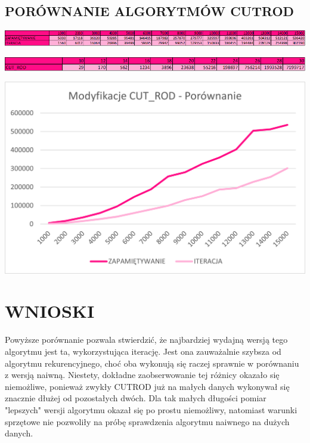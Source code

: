 \documentclass{article}
\begin{document}
\subsection*{PORÓWNANIE ALGORYTMÓW CUTROD}
\begin{center}
	\includegraphics[width = \textwidth]{Obraz8.png}
\end{center}
\begin{center}
	\includegraphics[width = \textwidth]{Obraz7.png}
\end{center}
\begin{center}
	\includegraphics[width = \textwidth]{Obraz3.png}
\end{center}
\section*{WNIOSKI}
Powyższe porównanie pozwala stwierdzić, że najbardziej wydajną wersją tego algorytmu jest ta, wykorzystująca iterację. Jest ona zauważalnie szybsza od algorytmu rekurencyjnego, choć oba wykonują się raczej sprawnie w porównaniu z wersją naiwną. Niestety, dokładne zaobserwowanie tej różnicy okazało się niemożliwe, ponieważ zwykły CUTROD już na małych danych wykonywał się znacznie dłużej od pozostałych dwóch. Dla tak małych długości pomiar "lepszych" wersji algorytmu okazał się po prostu niemożliwy, natomiast warunki sprzętowe nie pozwoliły na próbę sprawdzenia algorytmu naiwnego na dużych danych.
\end{document}
